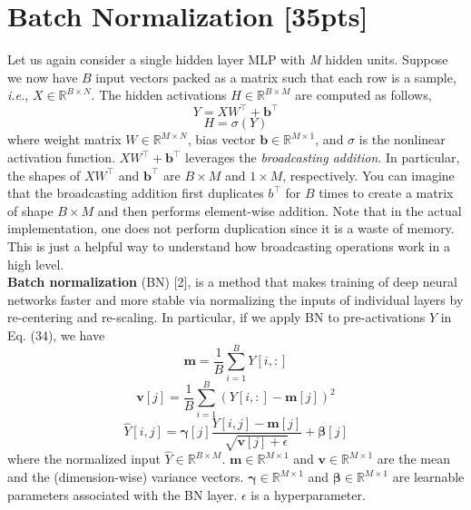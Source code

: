 \documentclass{article}
\begin{document}
\section{Batch Normalization [35pts]}
\noindent
Let us again consider a single hidden layer MLP with \textit{M} hidden units. Suppose we now have $B$ input vectors packed as a matrix such that each row is a sample, \textit{i.e.}, $X \in \mathbb{R}^{B \times N}$. The hidden activations $H \in \mathbb{R}^{B \times M}$ are computed as follows,
\begin{equation}
    Y=XW^{\top}+\textbf{b}^{\top}
\end{equation}
\begin{equation}
    H=\sigma(Y)
\end{equation}
where weight matrix $W \in \mathbb{R}^{M \times N}$, bias vector $\textbf{b} \in \mathbb{R}^{M \times 1}$, and $\sigma$ is the nonlinear activation function. $XW^{\top} + \textbf{b}^{\top}$ leverages the \textit{broadcasting addition}. In particular, the shapes of $XW^{\top}$ and $\textbf{b}^{\top}$ are $B \times M$ and $1 \times M$, respectively. You can imagine that the broadcasting addition first duplicates $b^{\top}$ for $B$ times to create a matrix of shape $B \times M$ and then performs element-wise addition. Note that in the actual implementation, one does not perform duplication since it is a waste of memory. This is just a helpful way to understand how broadcasting operations work in a high level.\\

\textbf{Batch normalization} (BN) [2], is a method that makes training of deep neural networks faster and more stable via normalizing the inputs of individual layers by re-centering and re-scaling. In particular, if we apply BN to pre-activations $Y$ in Eq. (34), we have 
\begin{equation}
    \textbf{m}=\frac{1}{B}\sum_{i=1}^{B} Y[i,:]
\end{equation}
\begin{equation}
    \textbf{v}[j]=\frac{1}{B}\sum_{i=1}^{B} (Y[i,:]-\textbf{m}[j])^{2}
\end{equation}
\begin{equation}
    \hat{Y}[i,j]=\boldsymbol{\gamma}[j] \frac{Y[i,j]-\textbf{m}[j]}{\sqrt{\textbf{v}[j]+\epsilon}}+\boldsymbol{\beta}[j]
\end{equation}
\noindent
where the normalized input $\hat{Y} \in \mathbb{R}^{B \times M}$. $\textbf{m} \in \mathbb{R}^{M \times 1}$ and $\textbf{v} \in \mathbb{R}^{M \times 1}$ are the mean and the (dimension-wise) variance vectors. $\boldsymbol{\gamma} \in \mathbb{R}^{M \times 1}$ and $\boldsymbol{\beta} \in \mathbb{R}^{M \times 1}$ are learnable parameters associated with the BN layer. $\epsilon$ is a hyperparameter.\\
\end{document}
